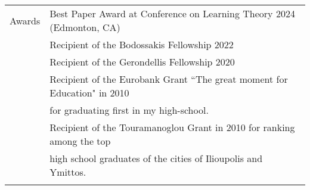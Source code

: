 \documentclass[letterpaper,11pt,oneside]{article}
\begin{document}
\begin{longtable}{@{} l l}
\Large{Awards}

 & Best Paper Award at Conference on Learning Theory 2024 (Edmonton, CA) \\

 & Recipient of the Bodossakis Fellowship 2022 \\

 & Recipient of the Gerondellis Fellowship 2020 \\

 & Recipient of the Eurobank Grant ``The great moment for Education" in 2010\\
 & for graduating first in my high-school. \\

 & Recipient of the Touramanoglou Grant in 2010 for ranking among the top \\
 & high school graduates of the cities of Ilioupolis and Ymittos. \\
 &\\


\end{longtable}
\end{document}
